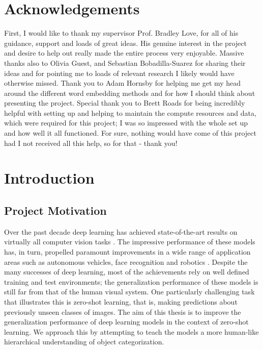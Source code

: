 \documentclass[12pt]{report}
\begin{document}
\chapter*{Acknowledgements}
\thispagestyle{empty}
First, I would like to thank my supervisor Prof. Bradley Love, for all of his guidance, support and loads of great ideas. His genuine interest in the project and desire to help out really made the entire process very enjoyable. Massive thanks also to Olivia Guest, and Sebastian Bobadilla-Suarez for sharing their ideas and for pointing me to loads of relevant research I likely would have otherwise missed. Thank you to Adam Hornsby for helping me get my head around the different word embedding methods and for how I should think about presenting the project. Special thank you to Brett Roads for being incredibly helpful with setting up and helping to maintain the compute resources and data, which were required for this project; I was so impressed with the whole set up and how well it all functioned. For sure, nothing would have come of this project had I not received all this help, so for that - thank you!

\clearpage

\tableofcontents
\listoffigures
\listoftables
\setcounter{page}{1}

\chapter[Introduction]{Introduction\raisebox{.3\baselineskip}{\normalsize\footnotemark}}

\section{Project Motivation}
Over the past decade deep learning has achieved state-of-the-art results on virtually all computer vision tasks \cite{Goodfellow2016}. The impressive performance of these models has, in turn, propelled paramount improvements in a wide range of application areas such as autonomous vehicles\cite{Bojarski2016}, face recognition \cite{Taigman2014} and robotics \cite{Finn2015}\cite{Ganegedara2017}. Despite the many successes of deep learning, most of the achievements rely on well defined training and test environments; the generalization performance of these models is still far from that of the human visual system. One particularly challenging task that illustrates this is zero-shot learning, that is, making predictions about previously unseen classes of images. The aim of this thesis is to improve the generalization performance of deep learning models in the context of zero-shot learning. We approach this by attempting to teach the models a more human-like hierarchical understanding of object categorization.
\end{document}
